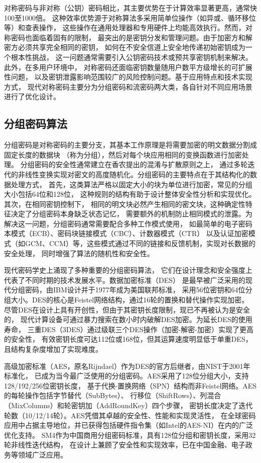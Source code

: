 对称密码与非对称（公钥）密码相比，其主要优势在于计算效率显著更高，通常快100至1000倍。
这种效率优势源于对称算法多采用简单位操作（如异或、循环移位等）和查表操作，
这些操作在通用处理器和专用硬件上均能高效执行。然而，对称密码也面临着固有的限制，
最突出的是密钥分发和管理问题。由于加密方和解密方必须共享完全相同的密钥，
如何在不安全信道上安全地传递初始密钥成为一个根本性挑战，
这一问题通常需要引入公钥密码技术或预共享密钥机制来解决。此外，在多用户环境中，
对称密码还面临密钥数量随用户数平方级增长的可扩展性问题，
以及密钥泄露影响范围较广的风险控制问题。基于应用特点和技术实现方式，
现代对称密码主要分为分组密码和流密码两大类，各自针对不同应用场景进行了优化设计。

\subsection{分组密码算法}
分组密码是对称密码的主要分支，其基本工作原理是将需要加密的明文数据分割成固定长度的数据块
（称为分组），然后对每个块应用相同的变换函数进行加密处理。
分组密码的安全性通常建立在香农提出的混淆与扩散原则之上，
通过多轮迭代的非线性变换实现对密文的高度随机化。分组密码的主要特点在于其结构化的数据处理方式，
首先，这类算法严格以固定大小的块为单位进行加密，常见的分组大小包括64位和128位，
这种规则的结构有助于设计整体安全性分析和实现优化。其次，在相同密钥控制下，
相同的明文块必然产生相同的密文块，这种确定性特征决定了分组密码本身缺乏状态记忆，
需要额外的机制防止相同模式的泄露。为解决这一问题，分组密码通常需要配合多种工作模式使用，
如最简单的电子密码本模式（ECB）、密码块链接模式（CBC）、计数器模式（CTR）
以及认证加密模式（如GCM、CCM）等，这些模式通过不同的链接和反馈机制，实现对长数据的安全处理，
同时增强了算法的随机性和安全性。

现代密码学史上涌现了多种重要的分组密码算法，
它们在设计理念和安全强度上代表了不同时期的技术发展水平。数据加密标准（DES）
是最早被广泛采用的现代分组密码，由IBM设计并于1977年成为美国联邦标准，
采用56位密钥和64位分组大小。DES的核心是Feistel网络结构，通过16轮的置换和替代操作实现加密。
尽管DES在设计上具有开创性，但由于其密钥长度限制，现已不再被认为是安全的，
现代计算设备可通过暴力搜索在数小时内破解DES加密。为延长DES的使用寿命，
三重DES（3DES）通过级联三个DES操作（加密-解密-加密）实现了更高的安全性，
有效密钥长度可达112位或168位，但其运算速度明显低于单重DES，且结构复杂度增加了实现难度。

高级加密标准（AES，原名Rijndael）作为DES的官方后继者，由NIST于2001年标准化，
已成为当今最广泛使用的分组密码。AES采用了128位分组大小，支持128/192/256位密钥长度，
基于代换-置换网络（SPN）结构而非Feistel网络。AES的每轮操作包括字节替代（SubBytes）、
行移位（ShiftRows）、列混合（MixColumns）和轮密钥加（AddRoundKey）四个步骤，
密钥长度决定了迭代轮数（10/12/14轮）。AES凭借其卓越的安全性、性能和实现灵活性，
在全球密码应用中占据主导地位，并已获得包括硬件指令集（如Intel的AES-NI）在内的广泛优化支持。
SM4作为中国商用分组密码标准，具有128位分组和密钥长度，采用32轮非线性迭代结构，
在设计上兼顾了安全性和实现效率，已在中国金融、电子政务等领域广泛应用。


